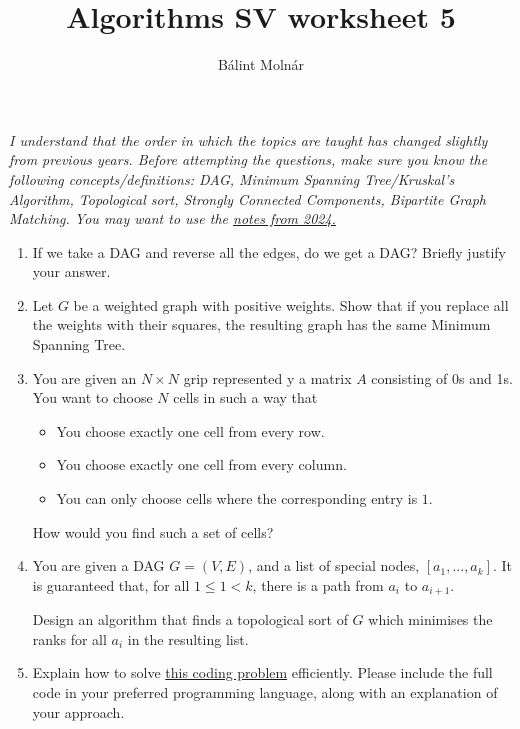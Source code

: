 \documentclass{article}
\title{{Algorithms SV worksheet 5}}
\author{Bálint Molnár}
\begin{document}
\maketitle
 
\emph{I understand that the order in which the topics are taught has changed slightly from previous years. Before attempting the questions, make sure you know the following concepts/definitions: DAG, Minimum Spanning Tree/Kruskal's Algorithm, Topological sort, Strongly Connected Components, Bipartite Graph Matching. You may want to use the \href{https://www.cl.cam.ac.uk/teaching/2324/Algorithm1/content/algorithms2.pdf}{notes from 2024.}} 

\begin{enumerate}
    \item If we take a DAG and reverse all the edges, do we get a DAG? Briefly justify your answer.

    \item Let $G$ be a weighted graph with positive weights. Show that if you replace all the weights with their squares, the resulting graph has the same Minimum Spanning Tree.

    \item You are given an $N \times N $ grip represented y a matrix $A$ consisting of 0s and 1s. You want to choose $N$ cells in such a way that
    \begin{itemize}
        \item You choose exactly one cell from every row.
        \item You choose exactly one cell from every column.
        \item You can only choose cells where the corresponding entry is $1$.
    \end{itemize}

    How would you find such a set of cells?


    \item You are given a DAG $G=(V,E)$, and a list of special nodes, $[a_1, ..., a_k]$. It is guaranteed that, for all $1 \leq 1 < k$, there is a path from $a_i$ to $a_{i+1}$.

    Design an algorithm that finds a topological sort of $G$ which minimises the ranks for all $a_i$ in the resulting list.


\item Explain how to solve \href{https://cses.fi/problemset/task/1677}{this coding problem} efficiently. Please include the full code in your preferred programming language, along with an explanation of your approach.


\end{enumerate}
\end{document}
